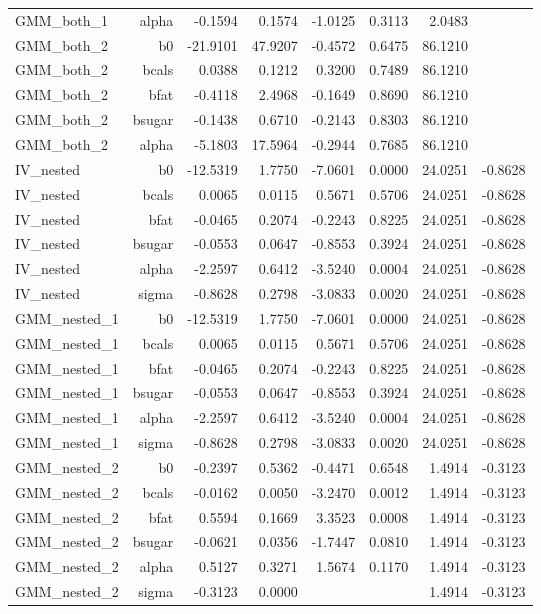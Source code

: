 \begin{longtable}{@{}lrrrrrrr@{}}
GMM\_both\_1 & alpha & -0.1594 & 0.1574 & -1.0125 & 0.3113 & 2.0483 &  \\
GMM\_both\_2 & b0 & -21.9101 & 47.9207 & -0.4572 & 0.6475 & 86.1210 &  \\
GMM\_both\_2 & bcals & 0.0388 & 0.1212 & 0.3200 & 0.7489 & 86.1210 &  \\
GMM\_both\_2 & bfat & -0.4118 & 2.4968 & -0.1649 & 0.8690 & 86.1210 &  \\
GMM\_both\_2 & bsugar & -0.1438 & 0.6710 & -0.2143 & 0.8303 & 86.1210 &  \\
GMM\_both\_2 & alpha & -5.1803 & 17.5964 & -0.2944 & 0.7685 & 86.1210 &  \\
IV\_nested & b0 & -12.5319 & 1.7750 & -7.0601 & 0.0000 & 24.0251 & -0.8628 \\
IV\_nested & bcals & 0.0065 & 0.0115 & 0.5671 & 0.5706 & 24.0251 & -0.8628 \\
IV\_nested & bfat & -0.0465 & 0.2074 & -0.2243 & 0.8225 & 24.0251 & -0.8628 \\
IV\_nested & bsugar & -0.0553 & 0.0647 & -0.8553 & 0.3924 & 24.0251 & -0.8628 \\
IV\_nested & alpha & -2.2597 & 0.6412 & -3.5240 & 0.0004 & 24.0251 & -0.8628 \\
IV\_nested & sigma & -0.8628 & 0.2798 & -3.0833 & 0.0020 & 24.0251 & -0.8628 \\
GMM\_nested\_1 & b0 & -12.5319 & 1.7750 & -7.0601 & 0.0000 & 24.0251 & -0.8628 \\
GMM\_nested\_1 & bcals & 0.0065 & 0.0115 & 0.5671 & 0.5706 & 24.0251 & -0.8628 \\
GMM\_nested\_1 & bfat & -0.0465 & 0.2074 & -0.2243 & 0.8225 & 24.0251 & -0.8628 \\
GMM\_nested\_1 & bsugar & -0.0553 & 0.0647 & -0.8553 & 0.3924 & 24.0251 & -0.8628 \\
GMM\_nested\_1 & alpha & -2.2597 & 0.6412 & -3.5240 & 0.0004 & 24.0251 & -0.8628 \\
GMM\_nested\_1 & sigma & -0.8628 & 0.2798 & -3.0833 & 0.0020 & 24.0251 & -0.8628 \\
GMM\_nested\_2 & b0 & -0.2397 & 0.5362 & -0.4471 & 0.6548 & 1.4914 & -0.3123 \\
GMM\_nested\_2 & bcals & -0.0162 & 0.0050 & -3.2470 & 0.0012 & 1.4914 & -0.3123 \\
GMM\_nested\_2 & bfat & 0.5594 & 0.1669 & 3.3523 & 0.0008 & 1.4914 & -0.3123 \\
GMM\_nested\_2 & bsugar & -0.0621 & 0.0356 & -1.7447 & 0.0810 & 1.4914 & -0.3123 \\
GMM\_nested\_2 & alpha & 0.5127 & 0.3271 & 1.5674 & 0.1170 & 1.4914 & -0.3123 \\
GMM\_nested\_2 & sigma & -0.3123 & 0.0000 &  &  & 1.4914 & -0.3123 \\
\bottomrule
\end{longtable}
\endgroup